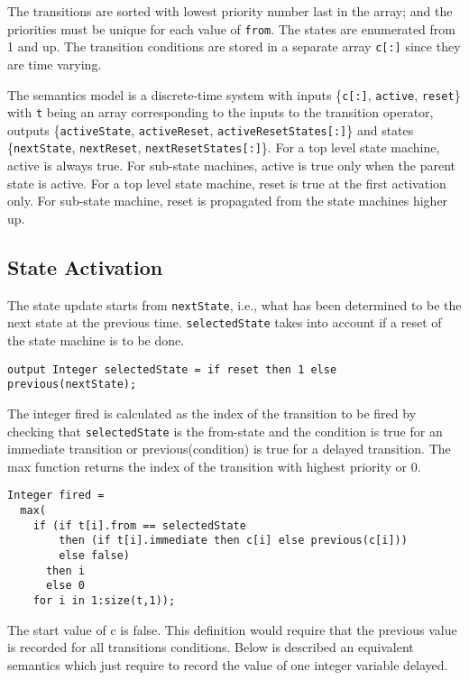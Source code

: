 The transitions are sorted with lowest priority number last in the
array; and the priorities must be unique for each value of \lstinline!from!. The
states are enumerated from 1 and up. The transition conditions are
stored in a separate array \lstinline!c[:]! since they are time varying.

The semantics model is a discrete-time system with inputs \{\lstinline!c[:]!,
\lstinline!active!, \lstinline!reset!\} with \lstinline!t! being an array corresponding to the inputs to the
transition operator, outputs \{\lstinline!activeState!, \lstinline!activeReset!,
\lstinline!activeResetStates[:]!\} and states \{\lstinline!nextState!, \lstinline!nextReset!,
\lstinline!nextResetStates[:]!\}. For a top level state machine, active is
always true. For sub-state machines, active is true only when the parent
state is active. For a top level state machine, reset is true at the
first activation only. For sub-state machine, reset is propagated from
the state machines higher up.

\subsection{State Activation}\label{state-activation}

The state update starts from \lstinline!nextState!, i.e., what has been determined to be the next state at the previous time.
\lstinline!selectedState! takes into account if a reset of the state machine is to be done.

\begin{lstlisting}[language=modelica]
output Integer selectedState = if reset then 1 else previous(nextState);
\end{lstlisting}
The integer fired is calculated as the index of the transition to be
fired by checking that \lstinline!selectedState! is the from-state and the condition
is true for an immediate transition or previous(condition) is true for a
delayed transition. The max function returns the index of the transition
with highest priority or 0.

\begin{lstlisting}[language=modelica]
Integer fired =
  max(
    if (if t[i].from == selectedState
        then (if t[i].immediate then c[i] else previous(c[i]))
        else false)
      then i
      else 0
    for i in 1:size(t,1));
\end{lstlisting}
The start value of c is false. This definition would require that the
previous value is recorded for all transitions conditions. Below is
described an equivalent semantics which just require to record the value
of one integer variable delayed.

